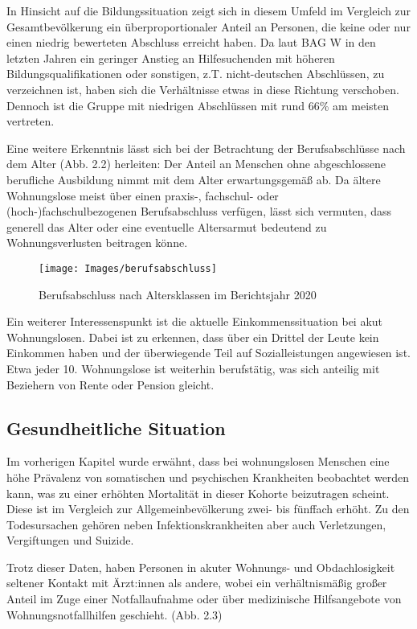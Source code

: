 In Hinsicht auf die Bildungssituation zeigt sich in diesem Umfeld im Vergleich zur Gesamtbevölkerung ein überproportionaler Anteil an Personen, die keine oder nur einen niedrig bewerteten Abschluss erreicht haben. Da laut \ac{BAG W} in den letzten Jahren ein geringer Anstieg an Hilfesuchenden mit höheren Bildungsqualifikationen oder sonstigen, z.T. nicht-deutschen Abschlüssen, zu verzeichnen ist, haben sich die Verhältnisse etwas in diese Richtung verschoben. Dennoch ist die Gruppe mit niedrigen Abschlüssen mit rund 66\% am meisten vertreten.

Eine weitere Erkenntnis lässt sich bei der Betrachtung der Berufsabschlüsse nach dem Alter (Abb. 2.2) herleiten: Der Anteil an Menschen ohne abgeschlossene berufliche Ausbildung nimmt mit dem Alter erwartungsgemäß ab. Da ältere Wohnungslose meist über einen praxis-, fachschul- oder (hoch-)fachschulbezogenen Berufsabschluss verfügen, lässt sich vermuten, dass generell das Alter oder eine eventuelle Altersarmut bedeutend zu Wohnungsverlusten beitragen könne.

\begin{figure}[h]
	\centering
	\texttt{[image: Images/berufsabschluss]}
	\caption[Berufsabschluss nach Alter]{Berufsabschluss nach Altersklassen im Berichtsjahr 2020 \citep{BAGW.2022}}
	\label{fig:berufsabschluss}
\end{figure}

Ein weiterer Interessenspunkt ist die aktuelle Einkommenssituation bei akut Wohnungslosen. Dabei ist zu erkennen, dass über ein Drittel der Leute kein Einkommen haben und der überwiegende Teil auf Sozialleistungen angewiesen ist. Etwa jeder 10. Wohnungslose ist weiterhin berufstätig, was sich anteilig mit Beziehern von Rente oder Pension gleicht.

\subsection{Gesundheitliche Situation}

Im vorherigen Kapitel wurde erwähnt, dass bei wohnungslosen Menschen eine höhe Prävalenz von somatischen und psychischen Krankheiten beobachtet werden kann, was zu einer erhöhten Mortalität in dieser Kohorte beizutragen scheint. Diese ist im Vergleich zur Allgemeinbevölkerung zwei- bis fünffach erhöht.\citep[vgl.]{DAE228829} Zu den Todesursachen gehören neben Infektionskrankheiten aber auch Verletzungen, Vergiftungen und Suizide. \citep{Beijer.2011}

Trotz dieser Daten, haben Personen in akuter Wohnungs- und Obdachlosigkeit seltener Kontakt mit Ärzt:innen als andere, wobei ein verhältnismäßig großer Anteil im Zuge einer Notfallaufnahme oder über medizinische Hilfsangebote von Wohnungsnotfallhilfen geschieht. (Abb. 2.3)


